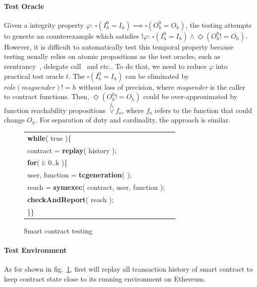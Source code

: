 \paragraph{Test Oracle}
Given a integrity property $\varphi$: $
\square (I_{h}^{0} = I_{h})\implies \square (O_{h}^{0} = O_{h})
$,
the testing attempts to generte an counterexample which satisfies $!\varphi$: $ 
\square (I_{h}^{0} = I_{h}) \land \Diamond (O_{h}^{0} != O_{h})
$.
However, it is difficult to automatically test this temporal property
because testing usually relies on atomic propositions as the test oracles, such as reentrancy~\cite{atzei2016survey}, delegate call~\cite{jiang2018contractfuzzer} and etc..  
To do that, we need to reduce $\varphi$ into practical test oracle $t$.
The $\square(I_{h}^{0} = I_{h})$ can be eliminated by $role(msgsender)!=h$ without loss of precision, where \textit{msgsender} is the caller to contract functions.
Then, $\Diamond (O_{h}^{0} != O_{h})$ could be over-approximated by function reachability propositions $\overset{f_o}{\lor} {f_o}$,
where $f_o$ refers to the function that could change $O_h$.
For separation of duty and cardinality, the approach is similar.
\begin{figure}
	\centering
	\begin{tabular}{l@{~}l}
		\textbf{while}( true )\{ & \\
		\; \; contract = \textbf{replay}( history ); & \\
		\; \; \textbf{for}( i: 0..k )\{ & \\
		\; \; \; \; user, function = \textbf{tcgeneration}( ); & \\
		\; \; \; \; reach = \textbf{symexec}( contract, user, function ); & \\
		\; \; \; \; \textbf{checkAndReport}( reach );&\\
		\}\}&\\  
	\end{tabular}
	\caption{Smart contract testing}
	\label{fig: testing}
\end{figure}
\paragraph{Test Environment}
As for shown in fig.~\ref{fig: testing}, 
first \spcon will replay all transaction history of smart contract to keep contract state close to its running environment on Ethereum.

